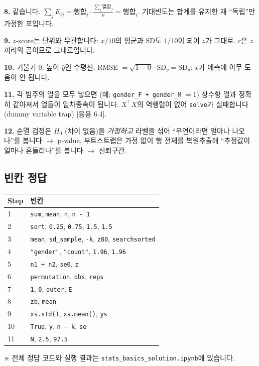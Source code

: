 \documentclass[11pt,a4paper]{article}
\newcommand{\code}[1]{\texttt{#1}}
\newcommand{\aside}[1]{{\footnotesize\color{black!65}#1}}
\newcommand{\Hc}[1]{{\scriptsize\textsf{\color{orange!70!black}[응용 #1]}}}
\begin{document}
\textbf{8.} 같습니다. $\sum_jE_{ij}=\text{행합}_i\cdot\frac{\sum_j\text{열합}_j}{n}=\text{행합}_i$. 기대빈도는 합계를 유지한 채 ``독립''만 가정한 표입니다.

\textbf{9.} $z$-score는 단위와 무관합니다: $x/10$의 평균과 SD도 $1/10$이 되어 $z$가 그대로. $r$은 $z$끼리의 곱이므로 그대로입니다.

\textbf{10.} 기울기 0, 높이 $\bar y$인 수평선. RMSE $=\sqrt{1-0}\cdot\text{SD}_y=\text{SD}_y$: $x$가 예측에 아무 도움이 안 됩니다.

\textbf{11.} 각 범주의 열을 모두 넣으면 (예: \code{gender\_F + gender\_M} $=1$) 상수항 열과 정확히 같아져서 열들이 일차종속이 됩니다. $X^\top X$의 역행렬이 없어 \code{solve}가 실패합니다 (dummy variable trap) \Hc{6.4}.

\textbf{12.} 순열 검정은 $H_0$ (차이 없음)을 \emph{가정하고} 라벨을 섞어 ``우연이라면 얼마나 나오나''를 봅니다 $\to$ p-value. 부트스트랩은 가정 없이 행 전체를 복원추출해 ``추정값이 얼마나 흔들리나''를 봅니다 $\to$ 신뢰구간.

\subsection{빈칸 정답}
\begin{center}\small
\begin{tabular}{@{}l l@{}}
\toprule
Step & 빈칸 \\
\midrule
1 & \code{sum}, \code{mean}, \code{n}, \code{n - 1} \\
2 & \code{sort}, \code{0.25}, \code{0.75}, \code{1.5}, \code{1.5} \\
3 & \code{mean}, \code{sd\_sample}, \code{-k}, \code{z80}, \code{searchsorted} \\
4 & \code{"gender"}, \code{"count"}, \code{1.96}, \code{1.96} \\
5 & \code{n1 + n2}, \code{se0}, \code{z} \\
6 & \code{permutation}, \code{obs}, \code{reps} \\
7 & \code{1}, \code{0}, \code{outer}, \code{E} \\
8 & \code{zb}, \code{mean} \\
9 & \code{xs.std()}, \code{xs.mean()}, \code{ys} \\
10 & \code{True}, \code{y}, \code{n - k}, \code{se} \\
11 & \code{N}, \code{2.5}, \code{97.5} \\
\bottomrule
\end{tabular}
\end{center}
\aside{※ 전체 정답 코드와 실행 결과는 \code{stats\_basics\_solution.ipynb}에 있습니다.}
\end{document}
